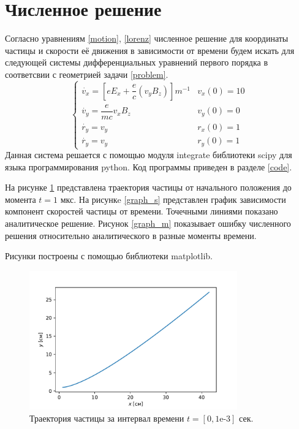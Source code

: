 \documentclass[a4paper]{article}
\begin{document}
\section{Численное решение}
Согласно уравнениям \eqref{motion}, \eqref{lorenz} численное решение для координаты частицы и скорости её движения в зависимости от времени будем искать для следующей системы дифференциальных уравнений первого порядка в соответсвии с геометрией задачи \ref{problem}.
\begin{equation}
	\begin{cases}
		\dot{v_x} = \left[eE_x + \dfrac{e}{c}\left(v_yB_z\right)\right]m^{-1}	
											& 	v_x(0) = 10 \\[10pt]
		\dot{v_y} = \dfrac{e}{mc} v_x B_z	&	v_y(0) = 0 \\[10pt]
		\dot{r_y} = v_y						&	r_x(0) = 1 \\[10pt]
		\dot{r_y} = v_y						&	r_y(0) = 1 
	\end{cases}
\end{equation}
Данная система решается с помощью модуля integrate библиотеки scipy для языка программирования python. Код программы приведен в разделе \ref{code}. 

На рисунке \ref{graph_t} представлена траектория частицы от начального положения до момента $t = 1$ мкс. На рисункe \ref{graph_s} представлен график зависимости компонент скоростей частицы от времени. Точечными линиями показано аналитическое решение.  Рисунок \ref{graph_m} показывает ошибку численного решения относительно аналитического в разные моменты времени.

Рисунки построены с помощью библиотеки matplotlib.

\begin{figure}
	\centering
	\includegraphics[width=0.8\textwidth]{plotTrajectory.pdf}
	\caption{Траектория частицы за интервал времени $t = [0, 1\text{e-}3]$ сек.}
	\label{graph_t}
\end{figure}
\end{document}
